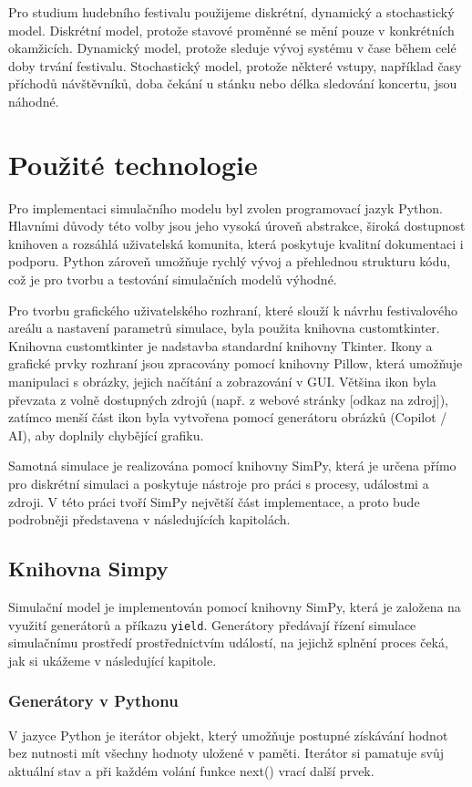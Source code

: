 \documentclass[12pt,a4paper]{article}
\begin{document}
Pro studium hudebního festivalu použijeme diskrétní, dynamický a stochastický model. Diskrétní model, protože stavové proměnné se mění pouze v konkrétních okamžicích. Dynamický model, protože sleduje vývoj systému v čase během celé doby trvání festivalu. Stochastický model, protože některé vstupy, například časy příchodů návštěvníků, doba čekání u stánku nebo délka sledování koncertu, jsou náhodné.

\section{Použité technologie}
Pro implementaci simulačního modelu byl zvolen programovací jazyk Python. Hlavními důvody této volby jsou jeho vysoká úroveň abstrakce, široká dostupnost knihoven a rozsáhlá uživatelská komunita, která poskytuje kvalitní dokumentaci i podporu. Python zároveň umožňuje rychlý vývoj a přehlednou strukturu kódu, což je pro tvorbu a testování simulačních modelů výhodné.

Pro tvorbu grafického uživatelského rozhraní, které slouží k návrhu festivalového areálu a nastavení parametrů simulace, byla použita knihovna customtkinter. Knihovna customtkinter je nadstavba standardní knihovny Tkinter. Ikony a grafické prvky rozhraní jsou zpracovány pomocí knihovny Pillow, která umožňuje manipulaci s obrázky, jejich načítání a zobrazování v GUI. Většina ikon byla převzata z volně dostupných zdrojů (např. z webové stránky [odkaz na zdroj]), zatímco menší část ikon byla vytvořena pomocí generátoru obrázků (Copilot / AI), aby doplnily chybějící grafiku.

Samotná simulace je realizována pomocí knihovny SimPy, která je určena přímo pro diskrétní simulaci a poskytuje nástroje pro práci s procesy, událostmi a zdroji. V této práci tvoří SimPy největší část implementace, a proto bude podrobněji představena v následujících kapitolách.

\subsection{Knihovna Simpy}
Simulační model je implementován pomocí knihovny SimPy, která je založena na využití generátorů a příkazu \texttt{yield}. 
Generátory předávají řízení simulace simulačnímu prostředí prostřednictvím událostí, 
na jejichž splnění proces čeká, jak si ukážeme v následující kapitole.

\subsubsection{Generátory v Pythonu}
V jazyce Python je iterátor objekt, který umožňuje postupné získávání hodnot bez nutnosti mít všechny hodnoty uložené v paměti. Iterátor si pamatuje svůj aktuální stav a při každém volání funkce next() vrací další prvek.
\end{document}
